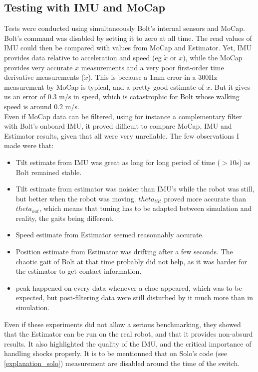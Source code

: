 \documentclass[a4paper,10pt]{article}
\begin{document}
\subsection{Testing with IMU and MoCap}
Tests were conducted using simultaneously Bolt's internal sensors and MoCap. Bolt's command was disabled by setting it to zero at all time. The read values of IMU could then be compared with values from MoCap and Estimator. Yet, IMU provides data relative to acceleration and speed (eg $\dot x$ or $\ddot x$), while the MoCap provides very accurate $x$ measurements and a very poor first-order time derivative measurements ($\dot x$). This is because a $1$mm error in a $300$Hz measurement by MoCap is typical, and a pretty good estimate of $x$. But it gives us an error of $0.3$ m/s in speed, which is catastrophic for Bolt whose walking speed is around $0.2$ m/s.\\
Even if MoCap data can be filtered, using for instance a complementary filter with Bolt's onboard IMU, it proved difficult to compare MoCap, IMU and Estimator results, given that all were very unreliable. The few observations I made were that:
\begin{itemize}
 \item Tilt estimate from IMU was great as long for long period of time ($>10$s) as Bolt remained stable.
 \item Tilt estimate from estimator was noisier than IMU's while the robot was still, but better when the robot was moving. $theta_{tilt}$ proved more accurate than $theta_{out}$, which means that tuning has to be adapted between simulation and reality, the gaits being different.
 \item Speed estimate from Estimator seemed reasonnably accurate.
 \item Position estimate from Estimator was drifting after a few seconds. The chaotic gait of Bolt at that time probably did not help, as it was harder for the estimator to get contact information.
 \item peak happened on every data whenever a choc appeared, which was to be expected, but post-filtering data were still disturbed by it much more than in simulation.
\end{itemize}
Even if these experiments did not allow a serious benchmarking, they showed that the Estimator can be run on the real robot, and that it provides non-absurd results. It also highlighted the quality of the IMU, and the critical importance of handling shocks properly. It is to be mentionned that on Solo's code (see \ref{explanation_solo}) measurement are disabled around the time of the switch.
\end{document}
